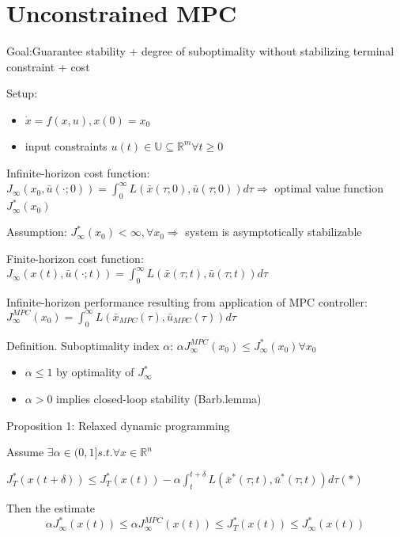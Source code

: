 \section{Unconstrained MPC}\label{chap3}

Goal:Guarantee stability + degree of suboptimality
without stabilizing terminal constraint + cost

Setup: 
\begin{itemize}
\item $\dot x = f(x,u), x(0)=x_0$
\item input constraints $u(t) \in \mathbb{U} \subseteq \mathbb{R}^m \forall t \geq 0$
\end{itemize}

Infinite-horizon cost function:
$J_{\infty}(x_0, \bar{u}(\cdot; 0)) = \int_{0}^{\infty}L(\bar x(\tau;0), \bar u(\tau;0))d\tau  \Rightarrow$ optimal value function $J_{\infty}^*(x_0)$

Assumption: $J^{*}_{\infty}(x_0) < \infty, \forall x_0 \Rightarrow$ system is asymptotically stabilizable

Finite-horizon cost function:
$J_{\infty}(x(t), \bar{u}(\cdot; t)) = \int_{0}^{\infty}L(\bar x(\tau;t), \bar u(\tau;t))d\tau$

Infinite-horizon performance resulting from application of MPC controller:
$J_{\infty}^{MPC}(x_0) = \int_{0}^{\infty}L(\bar x_{MPC}(\tau), \bar u_{MPC}(\tau))d\tau$

Definition. Suboptimality index $\alpha$:
$\alpha J_{\infty}^{MPC}(x_0) \leq J_{\infty}^{*}(x_0) \forall x_0$

\begin{itemize}
\item $\alpha \leq 1$ by optimality of $J^{*}_{\infty}$
\item $\alpha > 0$ implies closed-loop stability (Barb.lemma)
\end{itemize}

Proposition 1: Relaxed dynamic programming
 
Assume $\exists \alpha \in (0,1] s.t. \forall x \in \mathbb{R}^n$

$J_{T}^{*}(x(t+\delta)) \leq J_T^*(x(t)) - \alpha\int_{t}^{t+\delta}L(\bar x^*(\tau;t),\bar u^*(\tau;t))d\tau (*)$

Then the estimate 
\begin{equation}
\alpha J_{\infty}^*(x(t)) \leq \alpha J_{\infty}^{MPC}(x(t)) \leq J_T^*(x(t)) \leq J_{\infty}^*(x(t))
\end{equation}

